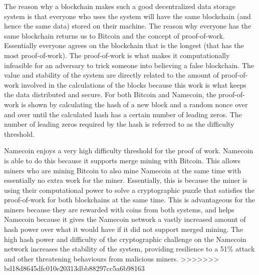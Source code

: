 The reason  why a blockchain makes such a good decentralized data storage system is that everyone who uses the system will have the same blockchain (and hence the same data) stored on their machine. The reason why everyone has the same blockchain returns us to Bitcoin and the concept of proof-of-work. Essentially everyone agrees on the blockchain that is the longest (that has the most proof-of-work). The proof-of-work is what makes it computationally infeasible for an adversary to trick someone into believing a false blockchain. The value and stability of the system are directly related to the amount of proof-of-work involved in the calculations of the blocks because this work is what keeps the data distributed and secure. For both Bitcoin and Namecoin, the proof-of-work is shown by calculating the hash of a new block and a random nonce over and over until the calculated hash has a certain number of leading zeros. The number of leading zeros required by the hash is referred to as the difficulty threshold. 

Namecoin enjoys a very high difficulty threshold for the proof of work. Namecoin is able to do this because it supports merge mining with Bitcoin. This allows miners who are mining Bitcoin to also mine Namecoin at the same time with essentially no extra work for the miner. Essentially, this is because the miner is using their computational power to solve a cryptographic puzzle that satisfies the proof-of-work for both blockchains at the same time. This is advantageous for the miners because they are rewarded with coins from both systems, and helps Namecoin because it gives the Namecoin network a vastly increased amount of hash power over what it would have if it did not support merged mining. The high hash power and difficulty of the cryptographic challenge on the Namecoin network increases the stability of the system, providing resilience to a 51\% attack and other threatening behaviours from malicious miners. 
>>>>>>> bd18d8645dfc010e20313dbb88297cc5a6b98163


